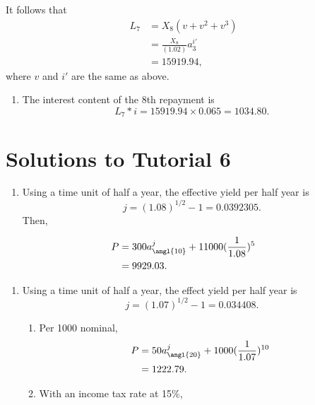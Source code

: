 \documentclass[
]{book}
\providecommand{\tightlist}{%
  \setlength{\itemsep}{0pt}\setlength{\parskip}{0pt}}
\theoremstyle{definition}
\theoremstyle{definition}
\theoremstyle{definition}
\theoremstyle{definition}
\theoremstyle{remark}
\begin{document}
It follows that
\[
\begin{aligned} L_7 &= X_8( v + v^2 + v^3) \\
&= \frac{X_8}{(1.02)} a^{i'}_3 \\
&= 15919.94,
\end{aligned}\]
where \(v\) and \(i'\) are the same as above.

\begin{enumerate}
\def\labelenumi{\arabic{enumi}.}
\setcounter{enumi}{2}
\tightlist
\item
  The interest content of the 8th repayment is
  \[ L_7 * i = 15919.94 \times 0.065 = 1034.80.\]
\end{enumerate}

\section{Solutions to Tutorial 6}\label{solutions-to-tutorial-6}

\begin{enumerate}
\def\labelenumi{\arabic{enumi}.}
\tightlist
\item
  Using a time unit of half a year, the effective yield per half year is
  \[j = (1.08)^{1/2} - 1 = 0.0392305.\]
  Then,
\end{enumerate}

\[
\begin{aligned}
P &= 300 a^j_{\angl{10}} + 11000 (\frac{1}{1.08})^{5} \\
&= 9929.03.
\end{aligned}
\]

\begin{enumerate}
\def\labelenumi{\arabic{enumi}.}
\setcounter{enumi}{1}
\item
  Using a time unit of half a year, the effect yield per half year is
  \[j = (1.07)^{1/2} - 1 = 0.034408.\]

  \begin{enumerate}
  \def\labelenumii{\arabic{enumii}.}
  \tightlist
  \item
    Per 1000 nominal,
    \[
    \begin{aligned}
    P &= 50 a^j_{\angl{20}} + 1000 (\frac{1}{1.07})^{10} \\
    &= 1222.79.
    \end{aligned}
    \]
  \item
    With an income tax rate at 15\%,
  \end{enumerate}
\end{enumerate}
\end{document}
